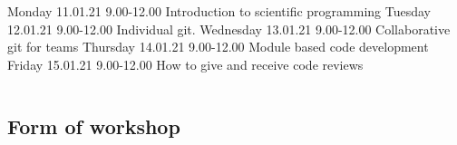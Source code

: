 \documentclass[usenames,dvipsnames]{beamer}
\theoremstyle{plain}
\theoremstyle{definition}
\begin{document}
\begin{frame}{\setframetitle{}}
  \begin{columns}[t]
    \centering
    Monday 11.01.21 9.00-12.00 Introduction to scientific programming
    \centering
    Tuesday 12.01.21 9.00-12.00 Individual git.
    \centering
    Wednesday 13.01.21 9.00-12.00 Collaborative git for teams
    \centering
Thursday 14.01.21 9.00-12.00 Module based code development
    \centering
Friday 15.01.21 9.00-12.00 How to give and receive code reviews
  \end{columns}
  \end{frame}




\subsection{Form of workshop}
\end{document}
